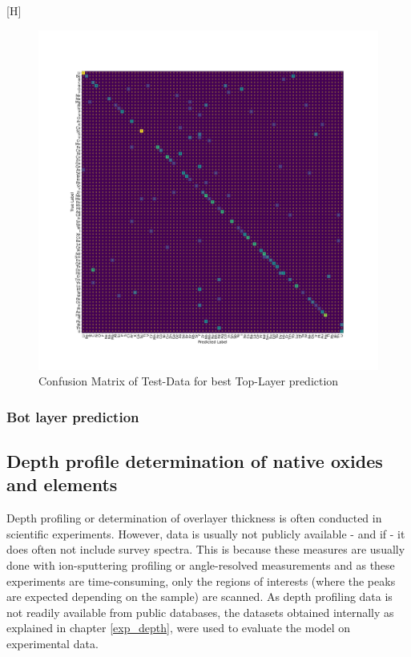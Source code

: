 \begin{center}[H]
\begin{figure}
        \centerline{\includegraphics[width=1.4\textwidth]{Figures/best_task_1_model_CM.png}}
    \centering
    \caption{Confusion Matrix of Test-Data for best Top-Layer prediction}
    \label{cm_cnn_1l}
\end{figure}
\end{center}

\subsubsection{Bot layer prediction}


\subsection{Depth profile determination of native oxides and elements}
Depth profiling or determination of overlayer thickness is often conducted in scientific experiments. However, data is usually not publicly available - and if - it does often not include survey spectra. This is because these measures are usually done with ion-sputtering profiling or angle-resolved measurements and as these experiments are time-consuming, only the regions of interests (where the peaks are expected depending on the sample) are scanned.
As depth profiling data is not readily available from public databases, the datasets obtained internally as explained in chapter \ref{exp_depth}, were used to evaluate the model on experimental data.


